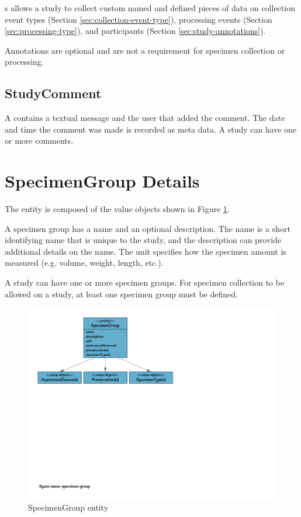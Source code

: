 s allows a study to collect custom named and
defined pieces of data on collection event types (Section
\ref{sec:collection-event-type}), processing events (Section
\ref{sec:processing-type}), and participants (Section
\ref{sec:study-annotations}).

Annotations are optional and are not a requirement for specimen collection or
processing.

\subsection*{StudyComment}
A  contains a textual message and the user that
added the comment. The date and time the comment was made is recorded as meta
data. A study can have one or more comments.

\section{SpecimenGroup Details}
\label{sec:specimen-group}

The  entity is composed of the value objects shown
in Figure \ref{fig:specimen-group}.

A specimen group has a name and an optional description. The name is a short
identifying name that is unique to the study, and the description can provide
additional details on the name. The unit specifies how the specimen amount is
measured (e.g. volume, weight, length, etc.).

A study can have one or more specimen groups. For specimen collection to be
allowed on a study, at least one specimen group must be defined.

\begin{figure}[H]
  \centering
  \includegraphics[trim={9mm 130mm 80mm 9mm}, clip,
    width=1\textwidth]{images/specimen-group}
  \caption{SpecimenGroup entity}
  \label{fig:specimen-group}
\end{figure}

